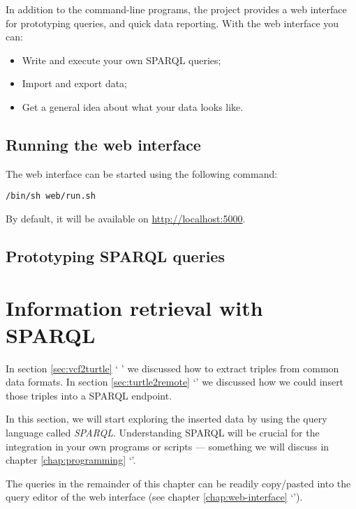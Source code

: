 \documentclass[11pt,a4paper,oneside]{book}
\begin{document}
  In addition to the command-line programs, the project provides a web
  interface for prototyping queries, and quick data reporting.  With the
  web interface you can:
  \begin{itemize}
  \item Write and execute your own SPARQL queries;
  \item Import and export data;
  \item Get a general idea about what your data looks like.
  \end{itemize}

\section{Running the web interface}

  The web interface can be started using the following command:

\begin{siderules}
\begin{verbatim}
/bin/sh web/run.sh
\end{verbatim}
\end{siderules}

  By default, it will be available on \url{http://localhost:5000}.

\section{Prototyping SPARQL queries}

\chapter{Information retrieval with SPARQL}

  In section \ref{sec:vcf2turtle} {\color{LinkGray}`%
  '} we discussed how to extract
  triples from common data formats.  In section \ref{sec:turtle2remote}
  {\color{LinkGray}`'}
  we discussed how we could insert those triples into a SPARQL endpoint.

  In this section, we will start exploring the inserted data by using the
  query language called \emph{SPARQL}.  Understanding SPARQL will be crucial
  for the integration in your own programs or scripts --- something we will
  discuss in chapter \ref{chap:programming}
  {\color{LinkGray}`'}.

  The queries in the remainder of this chapter can be readily copy/pasted into
  the query editor of the web interface (see chapter \ref{chap:web-interface}
  {\color{LinkGray}`'}).
\end{document}
